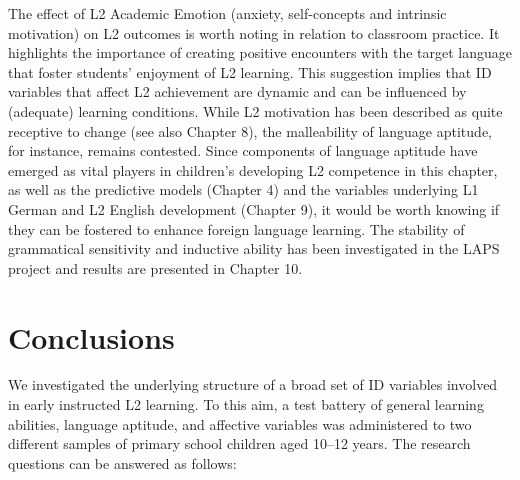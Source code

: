 \documentclass[output=paper]{langsci/langscibook}
\begin{document}
The effect of L2 Academic Emotion (anxiety, self-concepts and intrinsic motivation) on L2 outcomes is worth noting in relation to classroom practice. It highlights the importance of creating positive encounters with the target language that foster students’ enjoyment of L2 learning. This suggestion implies that ID variables that affect L2 achievement are dynamic and can be influenced by (adequate) learning conditions. While L2 motivation has been described as quite receptive to change (see also Chapter 8), the malleability of language aptitude, for instance, remains contested. Since components of language aptitude have emerged as vital players in children’s developing L2 competence in this chapter, as well as the predictive models (Chapter 4) and the variables underlying L1 German and L2 English development (Chapter 9), it would be worth knowing if they can be fostered to enhance foreign language learning. The stability of grammatical sensitivity and inductive ability has been investigated in the LAPS project and results are presented in Chapter 10.

\section{Conclusions}

We investigated the underlying structure of a broad set of ID variables involved in early instructed L2 learning. To this aim, a test battery of general learning abilities, language aptitude, and affective variables was administered to two different samples of primary school children aged 10--12 years. The research questions can be answered as follows:
\end{document}
